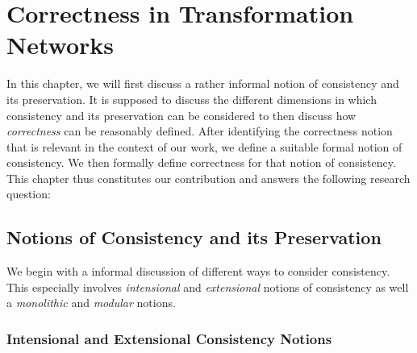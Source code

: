 \chapter{Correctness in Transformation Networks
}
\label{chap:correctness}



In this chapter, we will first discuss a rather informal notion of consistency and its preservation. It is supposed to discuss the different dimensions in which consistency and its preservation can be considered to then discuss how \emph{correctness} can be reasonably defined.
After identifying the correctness notion that is relevant in the context of our work, we define a suitable formal notion of consistency.
We then formally define correctness for that notion of consistency.
This chapter thus constitutes our contribution  and answers the following research question:


\section{Notions of Consistency and its Preservation}

We begin with a informal discussion of different ways to consider consistency. This especially involves \emph{intensional} and \emph{extensional} notions of consistency as well a \emph{monolithic} and \emph{modular} notions.


\subsection{Intensional and Extensional Consistency Notions}

